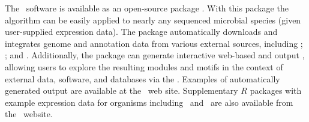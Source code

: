 The \cm\ software is available as an open-source  package
\cite{Ihaka1996}.  With this package the algorithm can be easily
applied to nearly any sequenced microbial species (given user-supplied
expression data). The package automatically downloads and integrates
genome and annotation data from various external sources, including
 \cite{vanHelden2000}; 
\cite{Alm2005}; and 
\cite{Szklarczyk2011}. Additionally, the package can generate
interactive web-based and  output
\cite{Shannon2003}, allowing users to explore the resulting modules
and motifs in the context of external data, software, and databases
via the  \cite{Shannon2006}. Examples of automatically
generated output are available at the \cm\ web site. Supplementary $R$
packages with example expression data for organisms including
\halo\ and \eco\ are also available from the \cm\ website.

